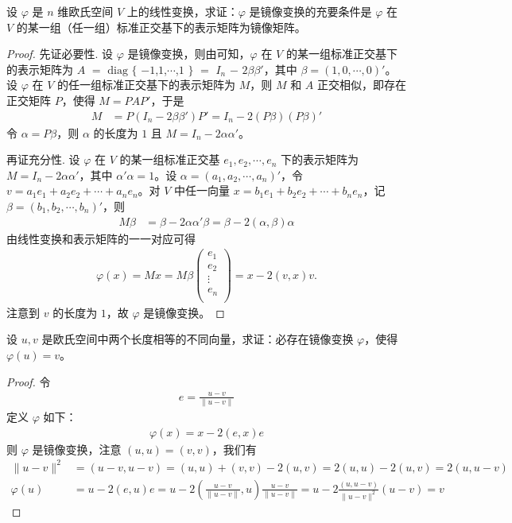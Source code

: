 \documentclass[../../main.tex]{subfiles}
\begin{document}
\begin{proposition}\label{proposition:例9.41}
设 \(\varphi\) 是 \(n\) 维欧氏空间 \(V\) 上的线性变换，求证：\(\varphi\) 是镜像变换的充要条件是 \(\varphi\) 在 \(V\) 的某一组（任一组）标准正交基下的表示矩阵为镜像矩阵。
\end{proposition}
\begin{proof}
先证必要性. 设 \(\varphi\) 是镜像变换，则由可知，\(\varphi\) 在 \(V\) 的某一组标准正交基下的表示矩阵为 $A$ $=$ $\mathrm{diag}$ $\{$ $-1$,$1$,$\cdots$,$1$ $\}$ $=$ $I_n$ $-$ $2\beta\beta'$，其中 \(\beta = (1,0,\cdots,0)'\)。设 \(\varphi\) 在 \(V\) 的任一组标准正交基下的表示矩阵为 \(M\)，则 \(M\) 和 \(A\) 正交相似，即存在正交矩阵 \(P\)，使得 \(M = PAP'\)，于是
\begin{align*}
M &= P(I_n - 2\beta\beta')P' = I_n - 2(P\beta)(P\beta)'
\end{align*}
令 \(\alpha = P\beta\)，则 \(\alpha\) 的长度为 \(1\) 且 \(M = I_n - 2\alpha\alpha'\)。

再证充分性. 设 \(\varphi\) 在 \(V\) 的某一组标准正交基 \(e_1,e_2,\cdots,e_n\) 下的表示矩阵为 \(M = I_n - 2\alpha\alpha'\)，其中 \(\alpha'\alpha = 1\)。设 \(\alpha = (a_1,a_2,\cdots,a_n)'\)，令 \(v = a_1e_1 + a_2e_2 + \cdots + a_ne_n\)。对 \(V\) 中任一向量 \(x = b_1e_1 + b_2e_2 + \cdots + b_ne_n\)，记 \(\beta = (b_1,b_2,\cdots,b_n)'\)，则
\begin{align*}
M\beta &= \beta - 2\alpha\alpha'\beta = \beta - 2(\alpha,\beta)\alpha
\end{align*}
由线性变换和表示矩阵的一一对应可得
\begin{align*}
\varphi (x)=Mx=M\beta \left( \begin{array}{c}
e_1\\
e_2\\
\vdots\\
e_n\\
\end{array} \right) =x-2(v,x)v.
\end{align*}
注意到 \(v\) 的长度为 \(1\)，故 \(\varphi\) 是镜像变换。
\end{proof}

\begin{proposition}\label{proposition:例9.42}
设 \(u,v\) 是欧氏空间中两个长度相等的不同向量，求证：必存在镜像变换 \(\varphi\)，使得 \(\varphi(u) = v\)。
\end{proposition}
\begin{proof}
令
\begin{align*}
e = \frac{u - v}{\|u - v\|}
\end{align*}
定义 \(\varphi\) 如下：
\begin{align*}
\varphi(x) = x - 2(e,x)e
\end{align*}
则 \(\varphi\) 是镜像变换，注意 \((u,u) = (v,v)\)，我们有
\begin{align*}
\|u - v\|^2 &= (u - v,u - v) = (u,u) + (v,v) - 2(u,v) = 2(u,u) - 2(u,v) = 2(u,u - v)\\
\varphi(u) &= u - 2(e,u)e = u - 2\left(\frac{u - v}{\|u - v\|},u\right)\frac{u - v}{\|u - v\|} = u - 2\frac{(u,u - v)}{\|u - v\|^2}(u - v) = v
\end{align*}
\end{proof}
\end{document}
